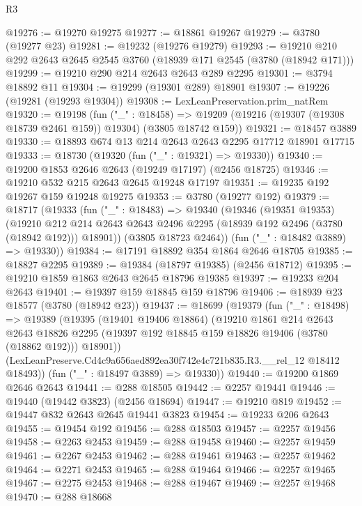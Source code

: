 \begin{lexlean}{R3}
\begin{coremodule}
@19276 := @19270 @19275
@19277 := @18861 @19267
@19279 := @3780 (@19277 @23)
@19281 := @19232 (@19276 @19279)
@19293 := @19210 @210 @292 @2643 @2645 @2545 @3760 (@18939 @171 @2545 (@3780 (@18942 @171)))
@19299 := @19210 @290 @214 @2643 @2643 @289 @2295
@19301 := @3794 @18892 @11
@19304 := @19299 (@19301 @289) @18901
@19307 := @19226 (@19281 (@19293 @19304))
@19308 := LexLeanPreservation.prim_natRem
@19320 := @19198
    (fun ("_" : @18458) =>
    @19209 (@19216 (@19307 (@19308 @18739 @2461 @159)) @19304) (@3805 @18742 @159))
@19321 := @18457 @3889
@19330 := @18893 @674 @13 @214 @2643 @2643 @2295 @17712 @18901 @17715
@19333 := @18730 (@19320 (fun ("_" : @19321) => @19330))
@19340 := @19200 @1853 @2646 @2643 (@19249 @17197) (@2456 @18725)
@19346 := @19210 @532 @215 @2643 @2645 @19248 @17197
@19351 := @19235 @192 @19267 @159 @19248 @19275
@19353 := @3780 (@19277 @192)
@19379 := @18717
    (@19333
      (fun ("_" : @18483) =>
      @19340
        (@19346
          (@19351 @19353)
          (@19210
            @212
            @214
            @2643
            @2643
            @2496
            @2295
            (@18939 @192 @2496 (@3780 (@18942 @192)))
            @18901))
        (@3805 @18723 @2464))
      (fun ("_" : @18482 @3889) => @19330))
@19384 := @17191 @18892 @354 @1864 @2646 @18705
@19385 := @18827 @2295
@19389 := @19384 (@18797 @19385) (@2456 @18712)
@19395 := @19210 @1859 @1863 @2643 @2645 @18796 @19385
@19397 := @19233 @204 @2643
@19401 := @19397 @159 @18845 @159 @18796
@19406 := @18939 @23 @18577 (@3780 (@18942 @23))
@19437 := @18699
    (@19379
      (fun ("_" : @18498) =>
      @19389
        (@19395
          (@19401 @19406 @18864)
          (@19210
            @1861
            @214
            @2643
            @2643
            @18826
            @2295
            (@19397 @192 @18845 @159 @18826 @19406 (@3780 (@18862 @192)))
            @18901))
        (LexLeanPreserve.Cd4c9a656aed892ea30f742e4c721b835.R3.__rel_12 @18412 @18493))
      (fun ("_" : @18497 @3889) => @19330))
@19440 := @19200 @1869 @2646 @2643
@19441 := @288 @18505
@19442 := @2257 @19441
@19446 := @19440 (@19442 @3823) (@2456 @18694)
@19447 := @19210 @819
@19452 := @19447 @832 @2643 @2645 @19441 @3823
@19454 := @19233 @206 @2643
@19455 := @19454 @192
@19456 := @288 @18503
@19457 := @2257 @19456
@19458 := @2263 @2453
@19459 := @288 @19458
@19460 := @2257 @19459
@19461 := @2267 @2453
@19462 := @288 @19461
@19463 := @2257 @19462
@19464 := @2271 @2453
@19465 := @288 @19464
@19466 := @2257 @19465
@19467 := @2275 @2453
@19468 := @288 @19467
@19469 := @2257 @19468
@19470 := @288 @18668

\end{coremodule}
\end{lexlean}
